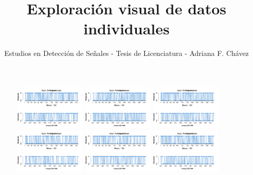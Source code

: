 \documentclass[a4paper ]{article}
\begin{document}
\title{Exploración visual de datos individuales}
\author{Estudios en Detección de Señales - Tesis de Licenciatura - Adriana F. Chávez}
\maketitle

\begin{figure}[th]
\centering
\includegraphics[width=0.3\textwidth]{Figures/Response_Exp1_P1} \includegraphics[width=0.3\textwidth]{Figures/Response_Exp1_P2} \includegraphics[width=0.3\textwidth]{Figures/Response_Exp1_P3}
\includegraphics[width=0.3\textwidth]{Figures/Response_Exp1_P4} \includegraphics[width=0.3\textwidth]{Figures/Response_Exp1_P5} \includegraphics[width=0.3\textwidth]{Figures/Response_Exp1_P6}

\end{figure}
\end{document}
